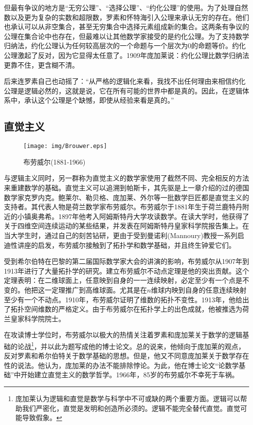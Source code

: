 \documentclass{article}
\begin{document}
但最有争议的地方是“无穷公理”、“选择公理”、“约化公理”的使用。为了处理自然数以及更为复杂的实数和超限数，罗素和怀特海引入公理来承认无穷的存在。他们也承认可以从非空集合，甚至无穷集合中选择元素组成新的集合。这两条有争议的公理在集合论中也存在，但最难以让其他数学家接受的是约化公理。为了支持数学归纳法，约化公理认为任何较高层次的一个命题与一个层次为0的命题等价。约化公理激起了反对，因为它显得太任意了。1909年庞加莱说：约化公理比数学归纳法更靠不住，更含糊不清。

后来连罗素自己也动摇了：“从严格的逻辑化来看，我找不出任何理由来相信约化公理是逻辑必然的，这就是说，它在所有可能的世界中都是真的。因此，在逻辑体系中，承认这个公理是个缺憾，即使从经验来看是真的。”\cite{M-Kline-2007}

\subsection{直觉主义}

\begin{wrapfigure}{L}{0.4\textwidth}
 \centering
 \texttt{[image: img/Brouwer.eps]}
 \captionsetup{labelformat=empty}
 \caption{布劳威尔(1881-1966)}
 \label{fig:Brouwer}
\end{wrapfigure}

与逻辑主义同时，另一群称为直觉主义的数学家使用了截然不同、完全相反的方法来重建数学的基础。直觉主义可以追溯到帕斯卡，其先驱是上一章介绍的过的德国数学家克罗内克。鲍莱尔、勒贝格、庞加莱、外尔等一批数学巨匠都是直觉主义的支持者。其代表人物是荷兰数学家布劳威尔。布劳威尔于1881年生于荷兰鹿特丹附近的小镇奥弗希。1897年他考入阿姆斯特丹大学攻读数学。在读大学时，他获得了关于四维空间连续运动的某些结果，并发表在阿姆斯特丹皇家科学院报告集上。在当大学生时，通过自己的刻苦钻研，更由于受到曼诺利(Mannoury)教授一系列启迪性讲座的启发，布劳威尔接触到了拓扑学和数学基础，并且终生钟爱它们。

受到希尔伯特在巴黎的第二届国际数学家大会的讲演的影响，布劳威尔从1907年到1913年进行了大量拓扑学的研究。建立布劳威尔不动点定理是他的突出贡献。这个定理表明：在二维球面上，任意映到自身的一一连续映射，必定至少有一个点是不变的。他把这一定理推广到高维球面。尤其是在$n$维球内映到自身的任意连续映射至少有一个不动点。1910年，布劳威尔证明了维数的拓扑不变性。1913年，他给出了拓扑空间维数的严格定义。由于布劳威尔在拓扑学上的出色成就，他被推选为荷兰皇家科学院院士。

在攻读博士学位时，布劳威尔以极大的热情关注着罗素和庞加莱关于数学的逻辑基础的论战\footnote{庞加莱认为逻辑和直觉是数学与科学中不可或缺的两个重要方面。逻辑可以帮助我们严密化，直觉是发明和创造所必须的。逻辑不能完全替代直觉。直觉可能导致假象\cite{Poincare2}。}，并以此为题写成他的博士论文。总的说来，他倾向于庞加莱的观点，反对罗素和希尔伯特关于数学基础的思想。但是，他又不同意庞加莱关于数学存在性的说法。他认为，庞加莱的办法不能排除悖论。为此，他在博士论文“论数学基础”中开始建立直觉主义的数学哲学。1966年，85岁的布劳威尔不幸死于车祸。
\end{document}

